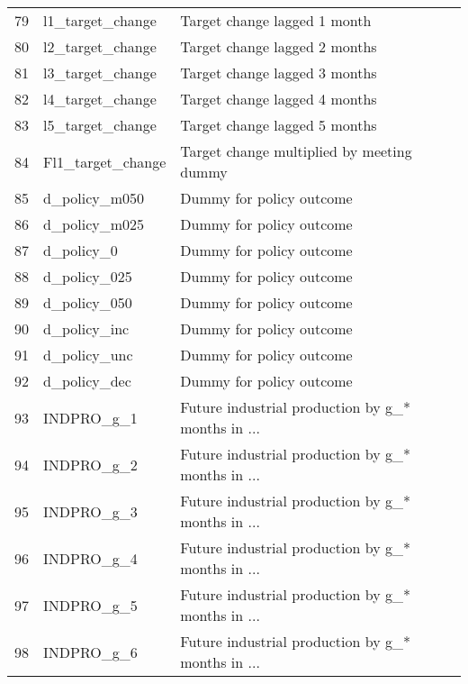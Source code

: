 \begin{tabular}{lll}
79  &           l1\_target\_change &                       Target change lagged 1 month \\
80  &           l2\_target\_change &                      Target change lagged 2 months \\
81  &           l3\_target\_change &                      Target change lagged 3 months \\
82  &           l4\_target\_change &                      Target change lagged 4 months \\
83  &           l5\_target\_change &                      Target change lagged 5 months \\
84  &          Fl1\_target\_change &          Target change multiplied by meeting dummy \\
85  &              d\_policy\_m050 &                           Dummy for policy outcome \\
86  &              d\_policy\_m025 &                           Dummy for policy outcome \\
87  &                 d\_policy\_0 &                           Dummy for policy outcome \\
88  &               d\_policy\_025 &                           Dummy for policy outcome \\
89  &               d\_policy\_050 &                           Dummy for policy outcome \\
90  &               d\_policy\_inc &                           Dummy for policy outcome \\
91  &               d\_policy\_unc &                           Dummy for policy outcome \\
92  &               d\_policy\_dec &                           Dummy for policy outcome \\
93  &                 INDPRO\_g\_1 &  Future industrial production by g\_* months in ... \\
94  &                 INDPRO\_g\_2 &  Future industrial production by g\_* months in ... \\
95  &                 INDPRO\_g\_3 &  Future industrial production by g\_* months in ... \\
96  &                 INDPRO\_g\_4 &  Future industrial production by g\_* months in ... \\
97  &                 INDPRO\_g\_5 &  Future industrial production by g\_* months in ... \\
98  &                 INDPRO\_g\_6 &  Future industrial production by g\_* months in ... \\

\end{tabular}
